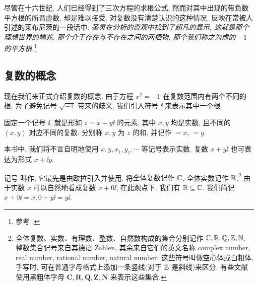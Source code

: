 尽管在十六世纪, 人们已经得到了三次方程的求根公式, 然而对其中出现的带负数平方根的所谓虚数, 却是难以接受.
对复数没有清楚认识的这种情况, 反映在常被人引述的莱布尼茨的一段话中: \textcolor{third}{\itshape 圣灵在分析的奇观中找到了超凡的显示, 这就是那个理想世界的端兆, 那个介于存在与不存在之间的两栖物, 那个我们称之为虚的 $-1$ 的平方根.}\footnote{%
  参考 \cite[第13章2节]{Kline1990}.
}


\subsection{复数的概念}

现在我们来正式介绍复数的概念.
由于方程 $x^2=-1$ 在复数范围内有两个不同的根, 为了避免记号 $\sqrt{-1}$ 带来的歧义, 我们引入符号 $\ii$ 来表示其中一个根.

\begin{definition}
  固定一个记号 $\ii$, 就是形如 $z=x+y\ii$ 的元素, 其中 $x,y$ 均是实数, 且不同的 $(x,y)$ 对应不同的复数.
  分别称 $x,y$ 为 $z$ 的和, 并记作 ${}=x$, ${}=y$.
\end{definition}

本书中, 我们将不言自明地使用 $x,y,x_1,y_1,\cdots$ 等记号表示实数.
复数 $x+y\ii$ 也可表达为形式 $x+\ii y$.

记号 \noun{$\ii$} 叫作, 它最先是由欧拉引入并使用.
将\alert{全体复数记作 ${\mathbb{C}}$}, 全体实数记作 ${\mathbb{R}}$.\footnote{%
  全体复数、实数、有理数、整数、自然数构成的集合分别记作 ${\mathbb{C}},{\mathbb{R}},{\mathbb{Q}},{\mathbb{Z}},{\mathbb{N}}$, 整数集合记号来自其德语 Zahlen, 其余来自它们的英文名称 complex number, real number, rational number, natural number.
  这些符号叫做空心体或白粗体, 手写时, 可在普通字母格式上添加一条竖线(对于 ${\mathbb{Z}}$ 是斜线)来区分.
  有些文献使用黑粗体字母 $\mathbf{C,R,Q,Z,N}$ 来表示这些集合.
}
由于实数 $x$ 可以自然地看成复数 $x+0\ii$, 在此观点下, 我们有 ${\mathbb{R}}\subseteq {\mathbb{C}}$.
我们简记 $x+0\ii=x,0+y\ii=y\ii$.

